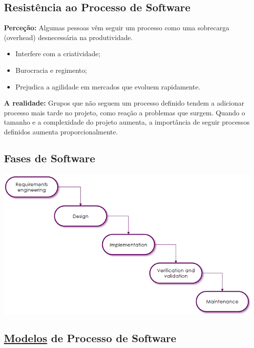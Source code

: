 \documentclass{article}
\begin{document}
\subsection{Resistência ao Processo de Software}

\begin{flushleft}
  \textbf{Perceção:} Algumas pessoas vêm seguir um processo como
  uma sobrecarga (overhead) desnecessária na produtividade.
  \begin{itemize}
    \item Interfere com a criatividade;
    \item Burocracia e regimento;
    \item Prejudica a agilidade em mercados que evoluem rapidamente.
  \end{itemize}

  \vspace{2mm}

  \textbf{A realidade:} Grupos que não seguem um processo definido
  tendem a adicionar processo mais tarde no projeto, como reação
  a problemas que surgem. Quando o tamanho e a complexidade do projeto
  aumenta, a importância de seguir processos definidos aumenta proporcionalmente. 
\end{flushleft}

\pagebreak

\subsection{Fases de Software}

\begin{center}
  \includegraphics[scale=0.6]{10}
\end{center}

\subsection{\uline{Modelos} de Processo de Software}
\end{document}

